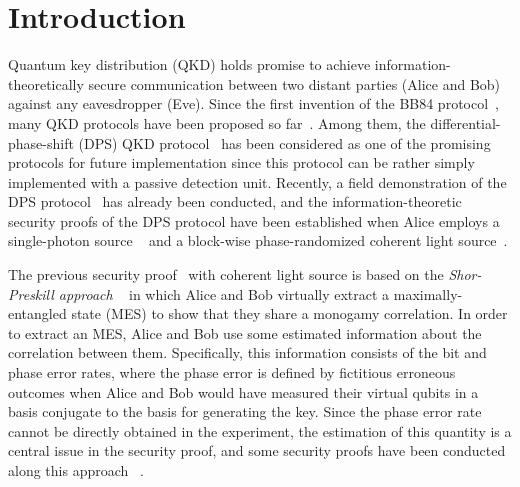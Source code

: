 \documentclass[prl,twocolumn,superscriptaddress,nofootinbib]{revtex4}
\begin{document}
\section{Introduction}
\label{sec:introduction}
Quantum key distribution (QKD) holds promise to achieve information-theoretically
secure communication between two distant parties (Alice and Bob) against any eavesdropper (Eve).
Since the first invention of the BB84 protocol~\cite{bb84}, many QKD protocols have been proposed so
far~\cite{e91,b92,six,sarg04,cow,PhysRevLett.89.037902,dps2003,CV2002}. 
Among them, the differential-phase-shift (DPS) QKD protocol~\cite{dps2003} has
been considered as one of the promising protocols for future implementation 
since this protocol can be rather simply implemented with a passive detection unit.
Recently, a field demonstration of the DPS protocol~\cite{tokyoQKD} has already been conducted, and the 
information-theoretic security proofs of the DPS protocol have been established when Alice employs a single-photon source
~\cite{PhysRevLett.103.170503} and a block-wise phase-randomized coherent light source~\cite{Kiyoshi2012dps}.

The previous security proof~\cite{Kiyoshi2012dps} with coherent light source is based on the {\it Shor-Preskill approach}
~\cite{PhysRevLett.85.441} in which 
Alice and Bob virtually extract a maximally-entangled state (MES) to show that they share a monogamy correlation. 
In order to extract an MES, Alice and Bob use some estimated information about the correlation between them.
Specifically, this information consists of the bit and phase error rates, where the phase error is defined by
fictitious erroneous outcomes when Alice and Bob would have measured their virtual qubits
in a basis conjugate to the basis for generating the key. 
Since the phase error rate cannot be directly obtained in the experiment, the estimation of this quantity
is a central issue in the security proof, and some security proofs have been conducted along this approach
~\cite{PhysRevLett.90.057902,PhysRevLett.90.167904,PhysRevLett.93.120501,
  PhysRevLett.94.040503,PhysRevA.73.010302,PhysRevLett.103.170503}. 
\end{document}
